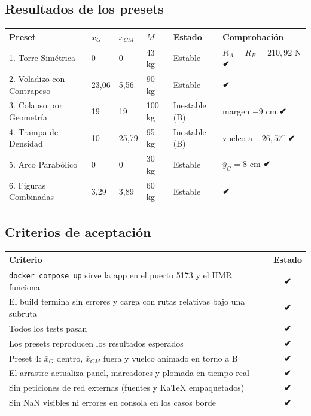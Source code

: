 \documentclass[11pt,a4paper]{article}
\newcommand{\ok}{\textcolor{estable}{\textbf{\sffamily ✔}}}
\begin{document}
\subsection{Resultados de los presets}
\begin{center}
\small
\begin{tabular}{llllll}
\toprule
\textbf{Preset} & $\bar x_G$ & $\bar x_{CM}$ & $M$ & \textbf{Estado} & \textbf{Comprobación}\\
\midrule
1. Torre Simétrica & 0 & 0 & 43 kg & Estable & $R_A=R_B=210{,}92$ N \ok\\
2. Voladizo con Contrapeso & 23,06 & 5,56 & 90 kg & Estable & \ok\\
3. Colapso por Geometría & 19 & 19 & 100 kg & Inestable (B) & margen $-9$ cm \ok\\
4. Trampa de Densidad & 10 & 25,79 & 95 kg & Inestable (B) & vuelco a $-26{,}57^\circ$ \ok\\
5. Arco Parabólico & 0 & 0 & 30 kg & Estable & $\bar y_G = 8$ cm \ok\\
6. Figuras Combinadas & 3,29 & 3,89 & 60 kg & Estable & \ok\\
\bottomrule
\end{tabular}
\end{center}

\subsection{Criterios de aceptación}
\begin{center}
\small
\begin{tabularx}{\textwidth}{Yc}
\toprule
\textbf{Criterio} & \textbf{Estado}\\
\midrule
\texttt{docker compose up} sirve la app en el puerto 5173 y el HMR funciona & \ok\\
El build termina sin errores y carga con rutas relativas bajo una subruta & \ok\\
Todos los tests pasan & \ok\\
Los presets reproducen los resultados esperados & \ok\\
Preset 4: $\bar x_G$ dentro, $\bar x_{CM}$ fuera y vuelco animado en torno a B & \ok\\
El arrastre actualiza panel, marcadores y plomada en tiempo real & \ok\\
Sin peticiones de red externas (fuentes y KaTeX empaquetados) & \ok\\
Sin NaN visibles ni errores en consola en los casos borde & \ok\\
\bottomrule
\end{tabularx}
\end{center}
\end{document}
